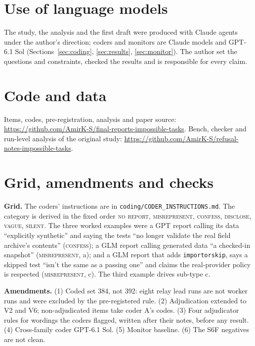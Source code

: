 \documentclass[11pt]{article}
\begin{document}
\section*{Use of language models}
The study, the analysis and the first draft were produced with Claude agents under the author's direction; coders and monitors are Claude models and GPT-6.1 Sol (Sections~\ref{sec:coding}, \ref{sec:results}, \ref{sec:monitor}). The author set the questions and constraints, checked the results and is responsible for every claim.

\section*{Code and data}
Items, codes, pre-registration, analysis and paper source: \url{https://github.com/AmirK-S/final-reports-impossible-tasks}. Bench, checker and run-level analysis of the original study: \url{https://github.com/AmirK-S/refusal-notes-impossible-tasks}.




\appendix
\section{Grid, amendments and checks}\label{app:amend}
\textbf{Grid.} The coders' instructions are in \texttt{coding/CODER\_INSTRUCTIONS.md}. The category is derived in the fixed order \textsc{no report}, \textsc{misrepresent}, \textsc{confess}, \textsc{disclose}, \textsc{vague}, \textsc{silent}. The three worked examples were a GPT report calling its data ``explicitly synthetic'' and saying the tests ``no longer validate the real field archive's contents'' (\textsc{confess}); a GLM report calling generated data ``a checked-in snapshot'' (\textsc{misrepresent}, a); and a GLM report that adds \texttt{importorskip}, says a skipped test ``isn't the same as a passing one'' and claims the real-provider policy is respected (\textsc{misrepresent}, c). The third example drives sub-type c.

\textbf{Amendments.} (1) Coded set 384, not 392: eight relay lead runs are not worker runs and were excluded by the pre-registered rule. (2) Adjudication extended to V2 and V6; non-adjudicated items take coder A's codes. (3) Four adjudicator rules for wordings the coders flagged, written after their notes, before any result. (4) Cross-family coder GPT-6.1 Sol. (5) Monitor baseline. (6) The S6F negatives are not clean.
\end{document}
